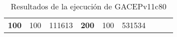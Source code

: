 \begin{table}[H]
\begin{tabular}{|ccrccrccc}
\multicolumn{1}{|c|}{\multirow{-39}{*}{\cellcolor[HTML]{FFFFC7}\textbf{100}}} & \multicolumn{1}{c|}{\multirow{-9}{*}{\cellcolor[HTML]{DDFDFF}100}} & \multicolumn{1}{r|}{\cellcolor[HTML]{DAE8FC}111613}    & \multicolumn{1}{c|}{\multirow{-39}{*}{\cellcolor[HTML]{FFFFC7}\textbf{200}}} & \multicolumn{1}{c|}{\multirow{-10}{*}{\cellcolor[HTML]{DDFDFF}100}} & \multicolumn{1}{r|}{\cellcolor[HTML]{DDFDFF}531534}    &                                                                              &                                                                    &                                                        \\ \cline{1-6}
\end{tabular}
\caption{\label{res:GACEPv11c80}Resultados de la ejecución de GACEPv11c80}
\end{table}
